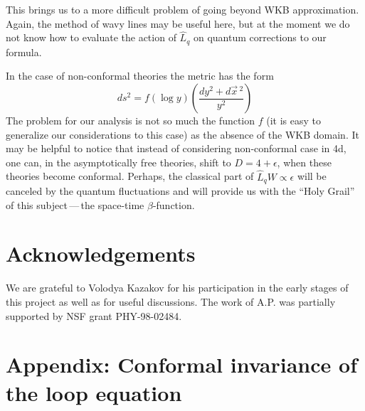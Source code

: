 \documentclass[a4paper,12pt]{article}
\numberwithin{equation}{section}
\begin{document}
This brings us to a more difficult problem of going beyond WKB approximation.
Again, the method of wavy lines may be useful here, but at the moment we do
not know how to evaluate the action of \( \widehat{L}_{q} \) on quantum corrections
to our formula. 

In the case of non-conformal theories the metric has the form
\[
ds^{2}=f(\log y)\left( \frac{dy^{2}+d\vec{x}\, ^{2}}{y^{2}}\right) \]
 The problem for our analysis is not so much the function \( f \) (it is easy
to generalize our considerations to this case) as the absence of the WKB domain.
It may be helpful to notice that instead of considering non-conformal case in
4d, one can, in the asymptotically free theories, shift to \( D=4+\epsilon  \),
when these theories become conformal. Perhaps, the classical part of \( \widehat{L}_{q}W\propto \epsilon  \)
will be canceled by the quantum fluctuations and will provide us with the ``Holy
Grail'' of this subject\,---\,the space-time \( \beta  \)-function. 


\section*{Acknowledgements}

We are grateful to Volodya Kazakov for his participation in the early stages
of this project as well as for useful discussions. The work of A.P. was partially
supported by NSF grant PHY-98-02484. 


\section*{Appendix: Conformal invariance of the loop equation}
\end{document}
